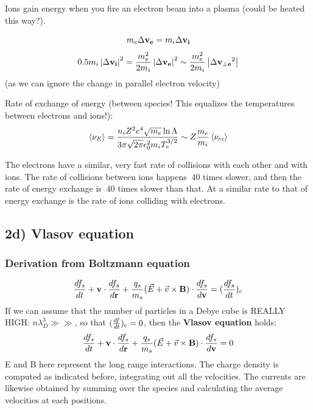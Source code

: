 Ions gain energy when you fire an electron beam into a plasma (could be heated this way?).

\[ m_e \Delta \mathbf{v_e} = m_i \Delta \mathbf{v_i}\]
\[ 0.5 m_i \left| \Delta \mathbf{v_i} \right|^2 = \frac{ m_e^2}{2 m_i} \left| \Delta \mathbf{v_e} \right|^2 \sim \frac{m_e^2}{2 m_i} \left| \Delta \mathbf{v_{\perp e}}^2 \right|\]
(as we can ignore the change in parallel electron velocity)

Rate of exchange of energy (between species! This equalizes the temperatures between electrons and ions!):
\[ \left< \nu_E \right> = \frac{n_i Z^2 e^4 \sqrt{m_e} \ln{\Lambda}}{3 \pi \sqrt{2 \pi} \epsilon_0^2 m_i T_e^{3/2}} \sim Z \frac {m_e}{m_i} \left< \nu_{ei} \right> \]

The electrons have a similar, very fast rate of collisions with each other and with ions. The rate of collisions between ions happens $~40$ times slower, and then the rate of energy exchange is $~40$ times slower than that. At a similar rate to that of energy exchange is the rate of ions colliding with electrons.

\subsection{2d) Vlasov equation}
\subsubsection{Derivation from Boltzmann equation}
\[\frac{d f_s}{d t} + \mathbf{v} \cdot \frac{d f_s}{d \mathbf{r}} + \frac{q_s}{m_s} (\vec{E} + \vec{v} \times \mathbf{B}) \cdot \frac{d f_s}{d \mathbf{v}} = (\frac{d f_s}{d t})_c\]
If we can assume that the number of particles in a Debye cube is REALLY HIGH: $n \lambda_D^3 \gg\gg$, so that  $(\frac{d f}{d t})_c=0$, then the \textbf{Vlasov equation} holds:
\[\frac{d f_s}{d t} + \mathbf{v} \cdot \frac{d f_s}{d \mathbf{r}} + \frac{q_s}{m_s} (\vec{E} + \vec{v} \times \mathbf{B}) \cdot \frac{d f_s}{d \mathbf{v}} = 0\]
E and B here represent the long range interactions. The charge density is computed as indicated before, integrating out all the velocities. The currents are likewise obtained by summing over the species and calculating the average velocities at each positions.

